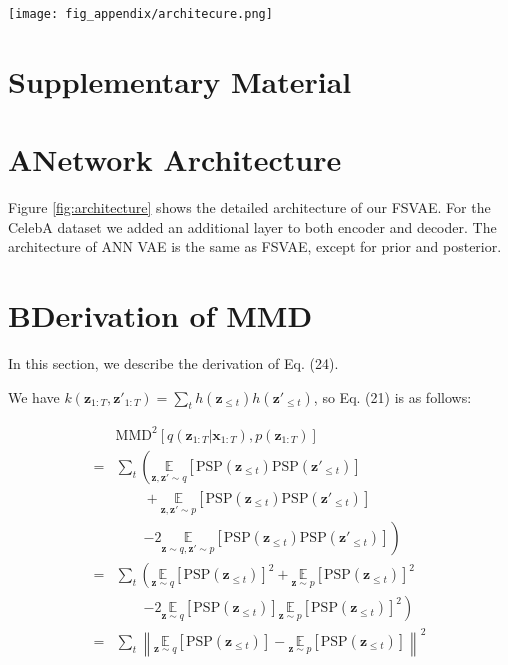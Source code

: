 \documentclass[letterpaper]{article} %
\begin{document}


\begin{figure*}[t!]
 \centering
  \texttt{[image: fig\_appendix/architecure.png]}
  \caption{Detailed architecture of FSVAE. After each layer a tdBN layer LIF neuron is inserted. In our settings, timstep $T$ is set to 16, latent dimension $C$ to 128, and $k$ to 20.}
  \label{fig:architecture}
\end{figure*}
\section{Supplementary Material}
\section{A\quad Network Architecture}


Figure \ref{fig:architecture} shows the detailed architecture of our FSVAE. For the CelebA dataset we added an additional layer to both encoder and decoder. The architecture of ANN VAE is the same as FSVAE, except for prior and posterior.


\section{B\quad Derivation of MMD}
In this section, we describe the derivation of Eq. (24).

We have $k(\bm{z}_{1:T},\bm{z}'_{1:T})=\sum_t h(\bm{z}_{\leq t})h(\bm{z}'_{\leq t})$, so Eq. (21) is as follows:



\begin{align*}
    &\mathrm{MMD}^2[q(\bm{z}_{1:T}|\bm{x}_{1:T}),p(\bm{z}_{1:T})] \nonumber\\
    =&\sum_t \left(\underset{\bm{z},\bm{z}'\sim q}{\mathbb{E}}[\mathrm{PSP}(\bm{z}_{\leq t})\mathrm{PSP}(\bm{z}'_{\leq t})] \right. \nonumber \\
     &\qquad +\underset{\bm{z},\bm{z}'\sim p}{\mathbb{E}}[\mathrm{PSP}(\bm{z}_{\leq t})\mathrm{PSP}(\bm{z}'_{\leq t})]  \nonumber\\
    &\qquad \left. -2\underset{\bm{z}\sim q,\bm{z}'\sim p}{\mathbb{E}}[\mathrm{PSP}(\bm{z}_{\leq t})\mathrm{PSP}(\bm{z}'_{\leq t})] \right) \nonumber \\
    =&\sum_t \left(\underset{\bm{z}\sim q}{\mathbb{E}}[\mathrm{PSP}(\bm{z}_{\leq t})]^2 + \underset{\bm{z}\sim p}{\mathbb{E}}[\mathrm{PSP}(\bm{z}_{\leq t})]^2 \right.\nonumber\\
     &\qquad \left. -2\underset{\bm{z}\sim q}{\mathbb{E}}[\mathrm{PSP}(\bm{z}_{\leq t})]\underset{\bm{z}\sim p}{\mathbb{E}}[\mathrm{PSP}(\bm{z}_{\leq t})]^2 \right) \nonumber\\
    =& \sum_t \left\| \underset{\bm{z}\sim q}{\mathbb{E}}[\mathrm{PSP}(\bm{z}_{\leq t})] - \underset{\bm{z}\sim p}{\mathbb{E}}[\mathrm{PSP}(\bm{z}_{\leq t})] \right\|^2 \nonumber
\end{align*}
\end{document}
